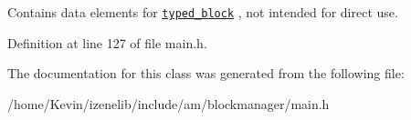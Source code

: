 Contains data elements for {\tt \hyperlink{classtyped__block}{typed\_\-block}} , not intended for direct use. 

Definition at line 127 of file main.h.

The documentation for this class was generated from the following file:\begin{CompactItemize}
\item 
/home/Kevin/izenelib/include/am/blockmanager/main.h\end{CompactItemize}
